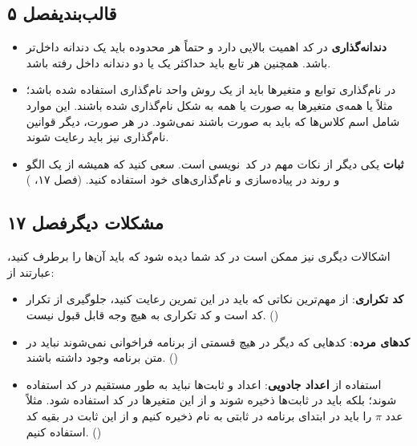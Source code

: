 \documentclass{utap}
\newcommand{\chap}[1]{\hfill\normalfont\normalsize فصل #1}
\begin{document}
\subsection[قالب‌بندی]{قالب‌بندی\chap{۵}}
  \begin{itemize}
        \item
\textbf{دندانه‌گذاری}
در کد اهمیت بالایی دارد و حتماً هر محدوده باید یک دندانه داخل‌تر باشد. همچنین هر تابع باید حداکثر یک یا دو دندانه داخل رفته باشد.
	\item
در نام‌گذاری توابع و متغیر‌ها باید از یک روش واحد نام‌گذاری استفاده شده باشد؛ مثلاً یا همه‌ی متغیر‌ها به صورت  یا همه به شکل  نام‌گذاری شده باشند. این موارد شامل اسم کلاس‌ها که باید به صورت  باشند نمی‌شود. در هر صورت، دیگر قوانین نام‌گذاری نیز باید رعایت شوند.
    \item
\textbf{ثبات} یکی دیگر از نکات مهم در کد~نویسی است. سعی کنید که همیشه از یک الگو و روند در پیاده‌سازی و نام‌گذاری‌های خود استفاده کنید. (فصل ۱۷، )
    \end{itemize}

\subsection[مشکلات دیگر]{مشکلات دیگر\chap{۱۷}}
اشکالات دیگری نیز ممکن است در کد شما دیده شود که باید آن‌ها را برطرف کنید، عبارتند از:
	  \begin{itemize}
        \item \textbf{کد تکراری}:
از مهم‌ترین نکاتی که باید در این تمرین رعایت کنید، جلوگیری از تکرار کد است و کد تکراری به هیچ وجه قابل قبول نیست. ()
		\item \textbf{کدهای مرده}:
کدهایی که دیگر در هیچ قسمتی از برنامه فراخوانی نمی‌شوند نباید در متن برنامه وجود داشته باشند. ()
		\item استفاده از \textbf{اعداد جادویی}:
اعداد و ثابت‌ها نباید به طور مستقیم در کد استفاده شوند؛ بلکه باید در ثابت‌ها ذخیره شوند و از این متغیر‌ها در کد استفاده شود. مثلاً عدد $\pi$ را باید در ابتدای برنامه در ثابتی به نام  ذخیره کنیم و از این ثابت در بقیه کد استفاده کنیم. ()
	   \end{itemize}
\end{document}
